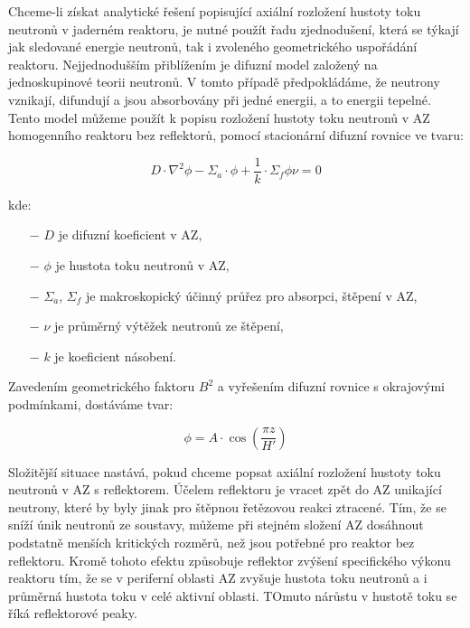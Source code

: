 Chceme-li získat analytické řešení popisující axiální rozložení hustoty toku neutronů v jaderném reaktoru, je nutné použít řadu zjednodušení, která se týkají jak sledované energie neutronů, tak i zvoleného geometrického uspořádání reaktoru. Nejjednodušším přiblížením je difuzní model založený na jednoskupinové teorii neutronů. V tomto případě předpokládáme, že neutrony vznikají, difundují a jsou absorbovány při jedné energii, a to energii tepelné. Tento model můžeme použít k popisu rozložení hustoty toku neutronů v AZ homogenního reaktoru bez reflektorů, pomocí stacionární difuzní rovnice ve tvaru:

\begin{equation*}
D \cdot \nabla^2 \phi - \Sigma_{a} \cdot \phi + \dfrac{1}{k} \cdot \Sigma_{f} \phi \nu= 0
\end{equation*}

kde:

\begin{itemize}
    \item[$-$] $D$ je difuzní koeficient v AZ,
    \item[$-$] $\phi$ je hustota toku neutronů v AZ,
    \item[$-$] $\Sigma_{a}$, $\Sigma_{f}$ je makroskopický účinný průřez pro absorpci, štěpení v AZ,
    \item[$-$] $\nu$ je průměrný výtěžek neutronů ze štěpení,
    \item[$-$] $k$ je koeficient násobení.
\end{itemize}

Zavedením geometrického faktoru $B^2$ a vyřešením difuzní rovnice s okrajovými podmínkami, dostáváme tvar:

\begin{equation}
    \phi = A \cdot \cos{\left(\dfrac{\pi z}{H'}\right)}
\end{equation}

Složitější situace nastává, pokud chceme popsat axiální rozložení hustoty toku neutronů v AZ s reflektorem. Účelem reflektoru je vracet zpět do AZ unikající neutrony, které by byly jinak pro štěpnou řetězovou reakci ztracené. Tím, že se sníží únik neutronů ze soustavy, můžeme při stejném složení AZ dosáhnout podstatně menších kritických rozměrů, než jsou potřebné pro reaktor bez reflektoru. Kromě tohoto efektu způsobuje reflektor zvýšení specifického výkonu reaktoru tím, že se v periferní oblasti AZ zvyšuje hustota toku neutronů a i průměrná hustota toku v celé aktivní oblasti. TOmuto nárůstu v hustotě toku se říká reflektorové peaky.

